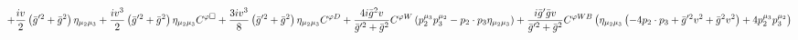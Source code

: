 %
\begin{dmath*}
%
  +  \frac{i v}{2}\left({\bar g}^{\prime 2} + {\bar g}{}^2\right) \eta_{\mu_2 \mu_3}  +  \frac{i v^3}{2}\left({\bar g}^{\prime 2} + {\bar g}{}^2\right) \eta_{\mu_2 \mu_3} C^{ \varphi  \Box}  +  \frac{3 i v^3}{8}\left({\bar g}^{\prime 2} + {\bar g}{}^2\right) \eta_{\mu_2 \mu_3} C^{ \varphi  D}  +  \frac{4 i {\bar g}{}^2 v}{{\bar g}^{\prime 2} + {\bar g}{}^2}C^{ \varphi  W} \left(p_2^{\mu_3} p_3^{\mu_2} - p_{2}\nobreak\cdot\nobreak{}p_{3} \eta_{\mu_2 \mu_3}\right)  +  \frac{i {\bar g}^\prime {\bar g}{} v}{{\bar g}^{\prime 2} + {\bar g}{}^2}C^{ \varphi  WB} \left(\eta_{\mu_2 \mu_3} \left( - 4 p_{2}\nobreak\cdot\nobreak{}p_{3} + {\bar g}^{\prime 2} v^2 + {\bar g}{}^2 v^2\right) + 4 p_2^{\mu_3} p_3^{\mu_2}\right)
%
\end{dmath*}
%
